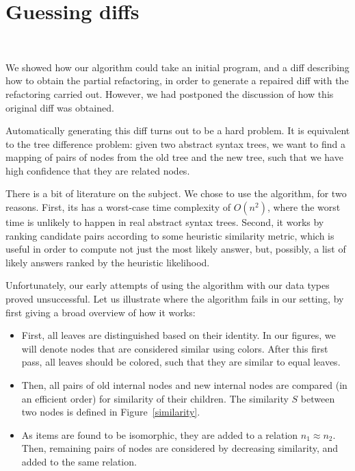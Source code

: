 \section{Guessing diffs}~\label{chick-guess}

We showed how our algorithm could take an initial program, and a diff describing
how to obtain the partial refactoring, in order to generate a repaired diff with
the refactoring carried out.  However, we had postponed the discussion of how
this original diff was obtained.

Automatically generating this diff turns out to be a hard problem.  It is
equivalent to the tree difference problem: given two abstract syntax trees, we
want to find a mapping of pairs of nodes from the old tree and the new tree,
such that we have high confidence that they are related nodes.

There is a bit of literature on the subject.  We chose to use the
 algorithm, for two reasons.  First, its has a worst-case time
complexity of $O(n^{2})$, where the worst time is unlikely to happen in real
abstract syntax trees.  Second, it works by ranking candidate pairs according to
some heuristic similarity metric, which is useful in order to compute not just
the most likely answer, but, possibly, a list of likely answers ranked by the
heuristic likelihood.

Unfortunately, our early attempts of using the algorithm with our data types
proved unsuccessful.  Let us illustrate where the algorithm fails in our
setting, by first giving a broad overview of how it works:

\begin{itemize}

  \item First, all leaves are distinguished based on their identity.  In our
figures, we will denote nodes that are considered similar using colors.  After
this first pass, all leaves should be colored, such that they are similar to
equal leaves.

  \item Then, all pairs of old internal nodes and new internal nodes are
compared (in an efficient order) for similarity of their children.  The
similarity $S$ between two nodes is defined in Figure~\ref{similarity}.

  \item As items are found to be isomorphic, they are added to a relation $n_{1}
\approx n_{2}$.  Then, remaining pairs of nodes are considered by decreasing
similarity, and added to the same relation.

\end{itemize}

